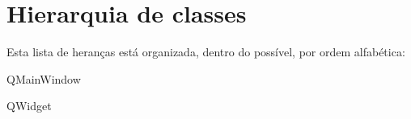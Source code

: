 \section{Hierarquia de classes}
Esta lista de heranças está organizada, dentro do possível, por ordem alfabética\+:\begin{DoxyCompactList}
\item Q\+Main\+Window\begin{DoxyCompactList}
\item {}
\end{DoxyCompactList}
\item Q\+Widget\begin{DoxyCompactList}
\item {}
\end{DoxyCompactList}
\end{DoxyCompactList}
